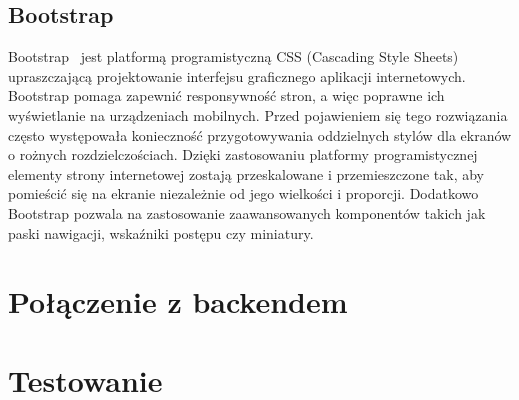 \subsection{Bootstrap}
Bootstrap~\cite{boot} jest platformą programistyczną CSS (Cascading Style Sheets) upraszczającą projektowanie interfejsu graficznego aplikacji internetowych. Bootstrap pomaga zapewnić responsywność stron, a więc poprawne ich wyświetlanie na urządzeniach mobilnych. Przed pojawieniem się tego rozwiązania często występowała konieczność przygotowywania oddzielnych stylów dla ekranów o rożnych rozdzielczościach. Dzięki zastosowaniu platformy programistycznej elementy strony internetowej zostają przeskalowane i przemieszczone tak, aby pomieścić się na ekranie niezależnie od jego wielkości i proporcji. Dodatkowo Bootstrap pozwala na zastosowanie zaawansowanych komponentów takich jak paski nawigacji, wskaźniki postępu czy miniatury. 
\section{Połączenie z backendem}
\section{Testowanie}




